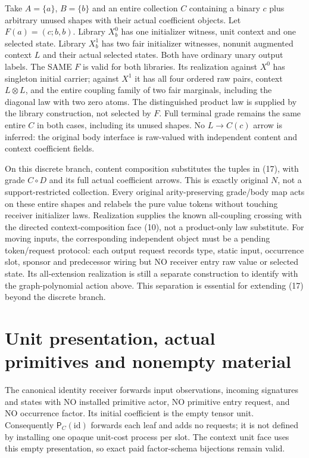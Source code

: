 \documentclass[11pt]{article}
\begin{document}
Take $A=\{a\}$, $B=\{b\}$ and an entire collection $C$ containing a binary $c$ plus arbitrary unused shapes with their actual coefficient objects. Let $F(a)=(c;b,b)$. Library $X^0_b$ has one initializer witness, unit context and one selected state. Library $X^1_b$ has two fair initializer witnesses, nonunit augmented context $L$ and their actual selected states. Both have ordinary unary output labels. The SAME $F$ is valid for both libraries. Its realization against $X^0$ has singleton initial carrier; against $X^1$ it has all four ordered raw pairs, context $L\otimes L$, and the entire coupling family of two fair marginals, including the diagonal law with two zero atoms. The distinguished product law is supplied by the library construction, not selected by $F$. Full terminal grade remains the same entire $C$ in both cases, including its unused shapes. No $L\to C(c)$ arrow is inferred: the original body interface is raw-valued with independent content and context coefficient fields.

On this discrete branch, content composition substitutes the tuples in (17), with grade $C\circ D$ and its full actual coefficient arrows. This is exactly original $N$, not a support-restricted collection. Every original arity-preserving grade/body map acts on these entire shapes and relabels the pure value tokens without touching receiver initializer laws. Realization supplies the known all-coupling crossing with the directed context-composition face (10), not a product-only law substitute. For moving inputs, the corresponding independent object must be a pending token/request protocol: each output request records type, static input, occurrence slot, sponsor and predecessor wiring but NO receiver entry raw value or selected state. Its all-extension realization is still a separate construction to identify with the graph-polynomial action above. This separation is essential for extending (17) beyond the discrete branch.

\section{Unit presentation, actual primitives and nonempty material}
The canonical identity receiver forwards input observations, incoming signatures and states with NO installed primitive actor, NO primitive entry request, and NO occurrence factor. Its initial coefficient is the empty tensor unit. Consequently $\mathsf P_C(\mathrm{id})$ forwards each leaf and adds no requests; it is not defined by installing one opaque unit-cost process per slot. The context unit face uses this empty presentation, so exact paid factor-schema bijections remain valid.
\end{document}
